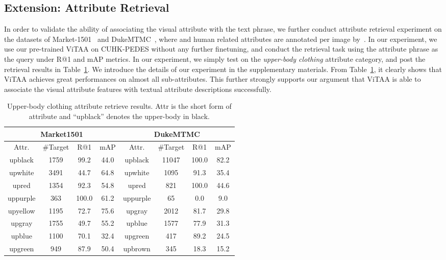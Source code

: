 \documentclass[runningheads]{llncs}
\begin{document}
\subsection{Extension: Attribute Retrieval}
In order to validate the ability of associating the visual attribute with the text phrase, we further conduct attribute retrieval experiment on the datasets of Market-1501~\cite{zheng2015scalable} and DukeMTMC~\cite{ristani2016performance}, where  and  human related attributes are annotated per image by~\cite{lin2019improving}. In our experiment, we use our pre-trained ViTAA on CUHK-PEDES without any further finetuning, and conduct the retrieval task using the attribute phrase as the query under R@1 and mAP metrics. In our experiment, we simply test on the \emph{upper-body clothing} attribute category, and post the retrieval results in Table~\ref{tab:attr_retrieve}. We introduce the details of our experiment in the supplementary materials. From Table~\ref{tab:attr_retrieve}, it clearly shows that ViTAA achieves great performances on almost all sub-attributes. This further strongly supports our argument that ViTAA is able to associate the visual attribute features with textual attribute descriptions successfully.


\begin{table}[t]
\caption{Upper-body clothing attribute retrieve results. Attr is the short form of attribute and ``upblack'' denotes the upper-body in black.}
\begin{center}
\setlength{\tabcolsep}{7.5pt}
{
\begin{tabular}{c|c|cc|c|c|cc}
\toprule[1pt]
\multicolumn{4}{c|}{Market1501} &\multicolumn{4}{c}{DukeMTMC} \\
\hline
Attr. &\#Target &R@1 &mAP &Attr. &\#Target &R@1 &mAP \\
\hline
upblack &1759 &99.2 &44.0 &upblack &11047 &100.0 &82.2 \\
upwhite &3491 &44.7 &64.8 &upwhite &1095 &91.3 &35.4 \\
upred &1354 &92.3 &54.8 &upred &821 &100.0 &44.6 \\
uppurple &363 &100.0 &61.2 &uppurple &65 &0.0 &9.0 \\
upyellow &1195 &72.7 &75.6 &upgray &2012 &81.7 &29.8 \\
upgray &1755 &49.7 &55.2 &upblue &1577 &77.9 &31.3 \\
upblue &1100 &70.1 &32.4 &upgreen &417 &89.2 &24.5 \\
upgreen &949 &87.9 &50.4 &upbrown &345 &18.3 &15.2 \\
\bottomrule[1pt]
\end{tabular}
}
\end{center}
\label{tab:attr_retrieve}
\end{table}
\end{document}

